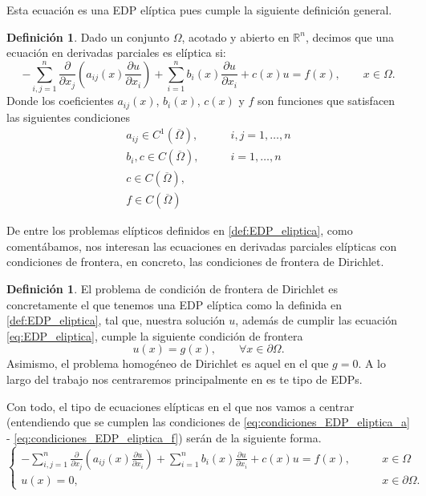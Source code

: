 \documentclass[a4paper,11pt,spanish, twoside, leqno]{tfg-uam}
\theoremstyle{definition}
\newtheorem{defin}[teor]{Definici\'on}
\begin{document}
Esta ecuación es una EDP elíptica pues cumple la siguiente definición general.


\begin{mdframed}
\begin{defin}
    Dado un conjunto $\Omega$, acotado y abierto en $\mathbb{R}^n$, decimos que una ecuación en derivadas parciales es elíptica si:
    \begin{equation}
        -\sum_{i,j=1}^{n} \frac{\partial}{\partial x_j}\left( a_{ij}(x)\frac{\partial u}{\partial x_i}\right) + \sum_{i=1}^{n} b_i(x)\frac{\partial u}{\partial x_i} + c(x)u = f(x), \qquad x\in\Omega.
    \end{equation}
    Donde los coeficientes $a_{ij}(x)$, $b_i(x)$, $c(x)$ y $f$ son funciones que satisfacen las siguientes condiciones
    \begin{align}
        a_{ij} \in C^1(\overline{\Omega}),& \qquad i,j = 1, \dots ,n \\
        b_i, c \in C(\overline{\Omega}),& \qquad i = 1, \dots ,n \\
        c \in C(\overline{\Omega}),& \\
        f\in C(\overline{\Omega})&
    \end{align}
\end{defin}
\end{mdframed}

De entre los problemas elípticos definidos en \ref{def:EDP_eliptica}, como comentábamos, nos interesan las ecuaciones en derivadas parciales elípticas con condiciones de frontera, en concreto, las condiciones de frontera de Dirichlet.

\begin{mdframed}
\begin{defin}    
    El problema de condición de frontera de Dirichlet es concretamente el que tenemos una EDP elíptica como la definida en \ref{def:EDP_eliptica}, tal que, nuestra solución $u$, además de cumplir las ecuación \eqref{eq:EDP_eliptica}, cumple la siguiente condición de frontera
    \begin{equation}
        u(x) = g(x), \qquad \forall x\in\partial\Omega.
    \end{equation}
    Asimismo, el problema homogéneo de Dirichlet es aquel en el que $g=0$. A lo largo del trabajo nos centraremos principalmente en es te tipo de EDPs.
\end{defin}
\end{mdframed}

Con todo, el tipo de ecuaciones elípticas en el que nos vamos a centrar (entendiendo que se cumplen las condiciones de \eqref{eq:condiciones_EDP_eliptica_a} - \eqref{eq:condiciones_EDP_eliptica_f}) serán de la siguiente forma.
\begin{equation}
    \begin{cases}
        -\sum_{i,j=1}^{n} \frac{\partial}{\partial x_j}\left( a_{ij}(x)\frac{\partial u}{\partial x_i}\right) + \sum_{i=1}^{n} b_i(x)\frac{\partial u}{\partial x_i} + c(x)u = f(x), \qquad & x\in\Omega \\
        u(x) = 0, & x\in\partial\Omega.
    \end{cases}
\end{equation}
\end{document}
